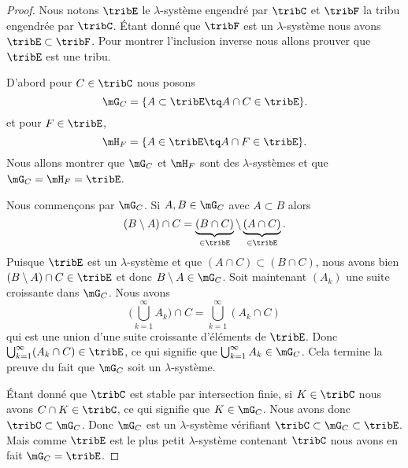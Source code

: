 \begin{proof}
	Nous notons \( \tribE\) le \( \lambda\)-système engendré par \( \tribC\) et \( \tribF\) la tribu engendrée par \( \tribC\). Étant donné que \( \tribF\) est un \( \lambda\)-système nous avons \( \tribE\subset\tribF\). Pour montrer l'inclusion inverse nous allons prouver que \( \tribE\) est une tribu.

	D'abord pour \( C\in\tribC\) nous posons
	\begin{equation}
		\mG_C=\{ A\subset \tribE\tq A\cap C\in\tribE \}.
	\end{equation}
	et pour \( F\in\tribE\),
	\begin{equation}
		\mH_F=\{ A\in\tribE\tq A\cap F\in\tribE \}.
	\end{equation}
	Nous allons montrer que \( \mG_C\) et \( \mH_F\) sont des \( \lambda\)-systèmes et que \( \mG_C=\mH_F=\tribE\).

	Nous commençons par \( \mG_C\). Si \( A,B\in\mG_C\) avec \( A\subset B\) alors
	\begin{equation}
		(B\setminus A)\cap C=\underbrace{(B\cap C)}_{\in\tribE}\setminus\underbrace{(A\cap C)}_{\in\tribE}.
	\end{equation}
	Puisque \( \tribE\) est un \( \lambda\)-système et que \( (A\cap C)\subset(B\cap C)\), nous avons bien \( (B\setminus A)\cap C\in\tribE\) et donc \( B\setminus A\in\mG_C\). Soit maintenant \( (A_k)\) une suite croissante dans \( \mG_C\). Nous avons
	\begin{equation}
		\big( \bigcup_{k=1}^{\infty}A_k \big)\cap C=\bigcup_{k=1}^{\infty}(A_k\cap C)
	\end{equation}
	qui est une union d'une suite croissante d'éléments de \( \tribE\). Donc \( \bigcup_{k=1}^{\infty}(A_k\cap C)\in\tribE\), ce qui signifie que \( \bigcup_{k=1}^{\infty}A_k\in\mG_C\). Cela termine la preuve du fait que \( \mG_C\) soit un \( \lambda\)-système.

	Étant donné que \( \tribC\) est stable par intersection finie, si \( K\in\tribC\) nous avons \( C\cap K\in\tribC\), ce qui signifie que \( K\in\mG_C\). Nous avons donc \( \tribC\subset\mG_C\). Donc \( \mG_C\) est un \( \lambda\)-système vérifiant \( \tribC\subset\mG_C\subset\tribE\). Mais comme \( \tribE\) est le plus petit \( \lambda\)-système contenant \( \tribC\) nous avons en fait \( \mG_C=\tribE\).


\end{proof}
